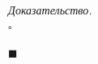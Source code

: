 \documentclass[14pt]{extarticle}
\let\Overrightarrow\overrightarrow
\let\vecarrow\overrightarrow
\theoremstyle{definition}
\theoremstyle{theorem}
\renewenvironment{proof}
    {\noindent \textit{Доказательство.}\\
	\indent $\square$}
	{ $\blacksquare$\\ }
\begin{document}
\begin{proof}

\end{proof}
\end{document}
